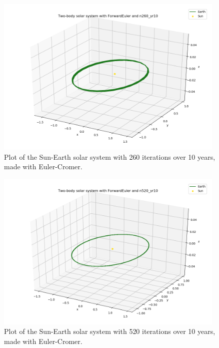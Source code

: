\documentclass{article}
\begin{document}
    \begin{figure}[H]
        \centering
        \includegraphics[width = 11cm]{img/plot3D_S_E_F_n260_yr10.png}
        \caption{Plot of the Sun-Earth solar system with 260 iterations over 10 years, made with Euler-Cromer. }
        \label{fig:plot3D_S_E_F_n260_yr10}
    \end{figure}

    \begin{figure}[H]
        \centering
        \includegraphics[width = 11cm]{img/plot3D_S_E_F_n520_yr10.png}
        \caption{Plot of the Sun-Earth solar system with 520 iterations over 10 years, made with Euler-Cromer. }
        \label{fig:plot3D_S_E_F_n520_yr10}
    \end{figure}
\end{document}
